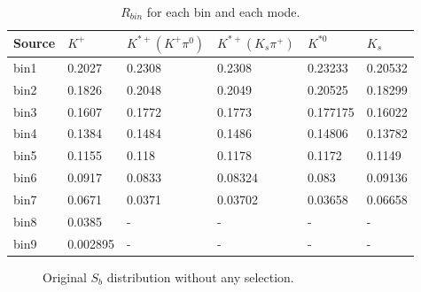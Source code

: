 \begin{table}[h]
\begin{center}
\begin{tabu}to \textwidth{ |X[l]|X[c]|X[c]|X[c]|X[c]|X[c]| }
\hline
Source & $K^+$ & $K^{*+}(K^+ \pi^0)$ & $K^{*+}(K_s \pi^+)$ & $K^{*0}$ & $K_s$\\ 
\hline
bin1 & 0.2027 & 0.2308 & 0.2308 &0.23233 & 0.20532\\
\hline
bin2 & 0.1826 & 0.2048 & 0.2049 &0.20525 & 0.18299 \\
\hline
bin3 & 0.1607 & 0.1772 & 0.1773 &0.177175 & 0.16022 \\
\hline
bin4 & 0.1384 & 0.1484 & 0.1486 &0.14806 & 0.13782 \\
\hline
bin5 & 0.1155 & 0.118  & 0.1178 &0.1172 & 0.1149 \\
\hline
bin6 & 0.0917 & 0.0833 & 0.08324 &0.083 & 0.09136 \\
\hline
bin7 & 0.0671 & 0.0371 & 0.03702 &0.03658 & 0.06658 \\
\hline
bin8 & 0.0385 & - & - & - & - \\
\hline
bin9 & 0.002895 & - & - & - & - \\
\hline
\end{tabu}
\caption{$R_{bin}$ for each bin and each mode.} \label{t:rbin}
\end{center}
\end{table}

\begin{figure}[h]
\centering
{}
\caption{Original $S_b$ distribution without any selection.}
\label{fig:sbcmwithotcut}	
\end{figure}

